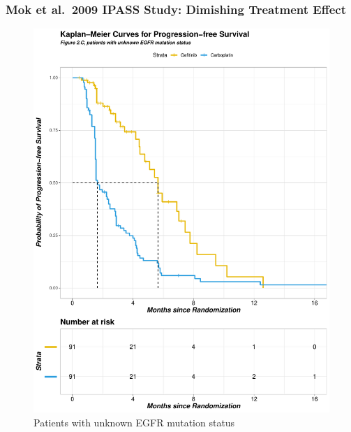 \documentclass[12pt,twoside]{reedthesis}
\begin{document}
\hypertarget{mok-et-al.-2009-ipass-study-dimishing-treatment-effect}{%
\subsubsection{Mok et al.~2009 IPASS Study: Dimishing Treatment Effect}\label{mok-et-al.-2009-ipass-study-dimishing-treatment-effect}}
\begin{figure}

{\centering \includegraphics[scale=0.55]{figure/mok.2.c} 

}

\caption{Patients with unknown EGFR mutation status}\label{fig:unnamed-chunk-7}
\end{figure}
\clearpage
\end{document}
